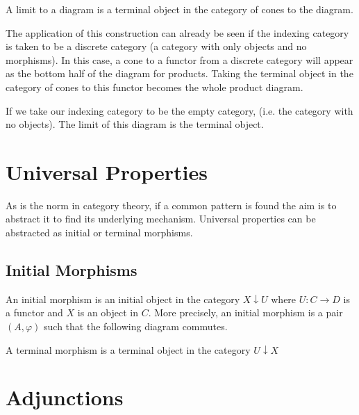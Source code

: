 \documentclass[a4paper,12pt]{article}
\begin{document}

A limit to a diagram is a terminal object in the category of cones to the
diagram.

The application of this construction can already be seen if the indexing
category is taken to be a discrete category (a category with only objects and
no morphisms). In this case, a cone to a functor from a discrete category will
appear as the bottom half of the diagram for products. Taking the terminal
object in the category of cones to this functor becomes the whole product
diagram.

If we take our indexing category to be the empty category, (i.e. the category
with no objects). The limit of this diagram is the terminal object.
\section{Universal Properties}
As is the norm in category theory, if a common pattern is found the aim is to
abstract it to find its underlying mechanism. Universal properties can
be abstracted as initial or terminal morphisms.

\subsection{Initial Morphisms}
An initial morphism is an initial object in the category $X \downarrow U$ where
$U : C \rightarrow D$ is a functor and $X$ is an object in $C$. More precisely,
an initial morphism is a pair $(A, \varphi)$ such that the following diagram
commutes.

A terminal morphism is a terminal object in the category $U \downarrow X$


\section{Adjunctions}
\end{document}
